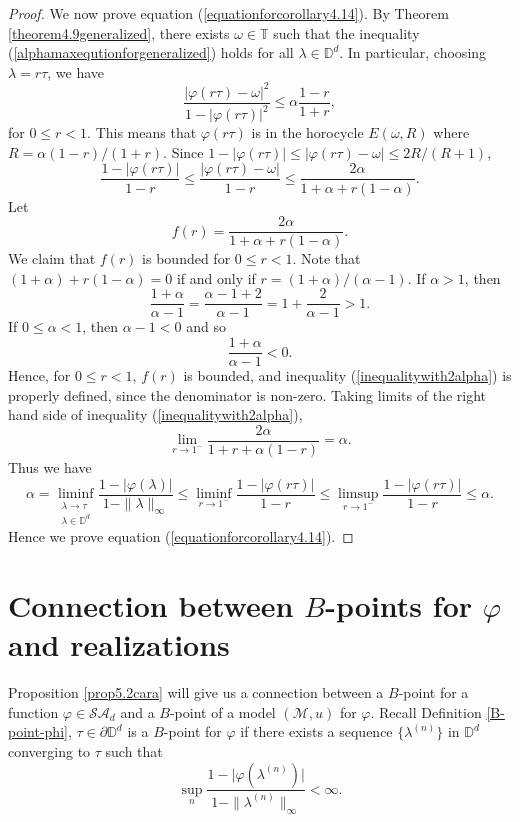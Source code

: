 \documentclass[11pt, reqno]{amsart}
\newcommand\1{\boldsymbol {1}}
\numberwithin{equation}{section}
\begin{document}
\begin{proof}
 We now prove equation (\ref{equationforcorollary4.14}). By Theorem \ref{theorem4.9generalized}, there exists $\omega\in\mathbb{T}$ such that the inequality (\ref{alphamaxequtionforgeneralized}) holds for all $\lambda\in\mathbb{D}^{d}$. In particular, choosing $\lambda=r\tau$, we have
$$\dfrac{\lvert \varphi(r\tau)-\omega\rvert^{2}}{1-\lvert \varphi(r\tau)\rvert^{2}}\leq\alpha \dfrac{1-r}{1+r},$$
for $0\leq r<1$. This means that $\varphi(r\tau)$ is in the horocycle $E(\omega,R)$ where $R=\alpha(1-r)/(1+r)$. Since $1-\lvert\varphi(r\tau)\rvert\leq\lvert \varphi(r\tau)-\omega\rvert\leq2R/(R+1)$, 
\begin{equation}\label{inequalitywith2alpha}
\dfrac{1-\lvert\varphi(r\tau)\rvert}{1-r}\leq \dfrac{\lvert\varphi(r\tau)-\omega\rvert}{1-r}\leq\dfrac{2\alpha}{1+\alpha+r(1-\alpha)}.
\end{equation}
Let 
$$f(r) = \dfrac{2\alpha}{1+\alpha+r(1-\alpha)}.$$
We claim that $f(r)$ is bounded for $0\leq r< 1$. Note that $(1+\alpha)+r(1-\alpha)=0$ if and only if $r=(1+\alpha)/(\alpha -1)$.  If $\alpha>1$, then 
$$\dfrac{1+\alpha}{\alpha-1} = \dfrac{\alpha-1+2}{\alpha-1}=1+\dfrac{2}{\alpha-1}>1.$$
If $0\leq\alpha<1$, then $\alpha-1<0$ and so
$$\dfrac{1+\alpha}{\alpha-1}<0.$$
Hence, for $0\leq r <1$, $f(r)$ is bounded, and inequality (\ref{inequalitywith2alpha}) is properly defined, since the denominator is non-zero. Taking limits of the right hand side of inequality (\ref{inequalitywith2alpha}),
$$\lim_{r\rightarrow 1^{-}}\dfrac{2\alpha}{1+r+\alpha(1-r)}=\alpha.$$
Thus we have
$$\alpha=\liminf_{\substack{\lambda\rightarrow\tau \\ \lambda\in\mathbb{D}^{d}}}\dfrac{1-\lvert \varphi(\lambda)\rvert}{1-\|\lambda\|_{\infty}}\leq \liminf_{r\rightarrow 1^{-}} \dfrac{1-\lvert \varphi(r\tau)\rvert}{1-r}\leq \limsup_{r\rightarrow 1^{-}} \dfrac{1-\lvert\varphi(r\tau)\rvert}{1-r}\leq \alpha.$$
Hence we prove equation (\ref{equationforcorollary4.14}). \end{proof}

\section{Connection between $B$-points for $\varphi$ and realizations}\label{B-point-realization}
Proposition \ref{prop5.2cara} will give us a connection between a $B$-point for a function $\varphi\in\mathcal{SA}_{d}$ and a $B$-point  of a model $(\mathcal{M},u)$ for $\varphi$.
Recall Definition \ref{B-point-phi},  $\tau\in\partial \mathbb{D}^{d}$ is a  $B$-point for $\varphi$
 if there exists a sequence $\{\lambda^{(n)}\}$ in $\mathbb{D}^{d}$ converging to $\tau$ such that 
 \begin{equation} \label{2.3}
\sup_{n}\dfrac{1-\lvert{\varphi(\lambda^{(n)})}\rvert}{1-\|\lambda^{(n)}\|_{\infty}}<\infty.
\end{equation} 
\end{document}
